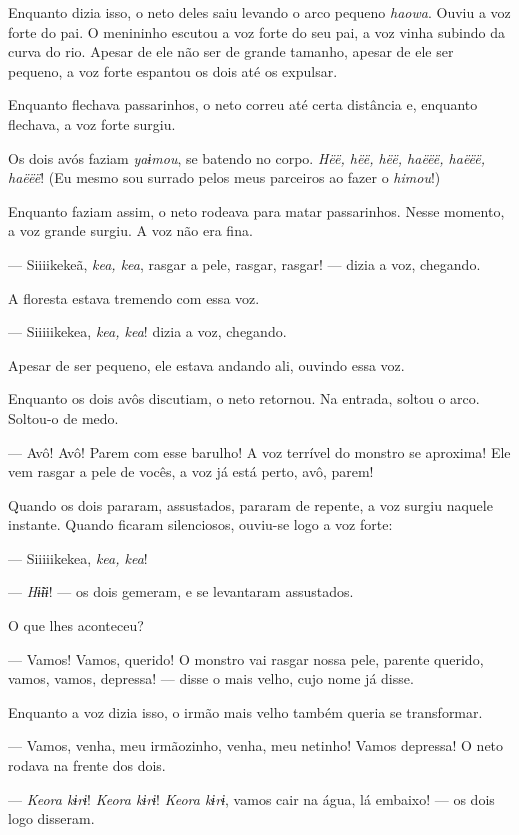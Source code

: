 Enquanto dizia isso, o neto deles saiu levando o arco pequeno \textit{haowa}.
Ouviu a voz forte do pai. O menininho escutou a voz forte do seu pai, a
voz vinha subindo da curva do rio. Apesar de ele não ser de grande
tamanho, apesar de ele ser pequeno, a voz forte espantou os dois até os
expulsar. 

Enquanto flechava passarinhos, o neto correu até certa distância e,
enquanto flechava, a voz forte surgiu. 

Os dois avós faziam \textit{yaɨmou}, se batendo no
corpo. \textit{Hëë, hëë, hëë, haëëë, haëëë, haëëë}! (Eu mesmo sou surrado
pelos meus parceiros ao fazer o \textit{himou}!) 

Enquanto faziam assim, o neto rodeava para matar passarinhos. Nesse
momento, a voz grande surgiu. A voz não era fina. 

--- Siiiikekeã, \textit{kea, kea}, rasgar a pele, rasgar, rasgar! --- dizia
a voz, chegando. 

A floresta estava tremendo com essa voz. 

--- Siiiiikekea, \textit{kea, kea}! dizia a voz, chegando. 

Apesar de ser pequeno, ele estava andando ali, ouvindo essa voz. 

Enquanto os dois avôs discutiam, o neto retornou. Na entrada, soltou o
arco. Soltou-o de medo. 

--- Avô! Avô! Parem com esse barulho! A voz terrível do monstro se
aproxima! Ele vem rasgar a pele de vocês, a voz já está perto, avô,
parem! 

Quando os dois pararam, assustados, pararam de repente, a voz surgiu
naquele instante. Quando ficaram silenciosos, ouviu-se logo a voz
forte: 

--- Siiiiikekea, \textit{kea, kea}! 

--- \textit{Hɨ̃ɨɨ}! --- os dois gemeram, e se levantaram assustados. 

O que lhes aconteceu?

--- Vamos! Vamos, querido! O monstro vai rasgar nossa pele, parente
querido, vamos, vamos, depressa! --- disse o mais velho, cujo nome já
disse. 

Enquanto a voz dizia isso, o irmão mais velho também queria se
transformar. 

--- Vamos, venha, meu irmãozinho, venha, meu netinho! Vamos depressa! O
neto rodava na frente dos dois. 

--- \textit{Keora kɨrɨ}! \textit{Keora kɨrɨ}! \textit{Keora kɨrɨ}, vamos cair na água, lá
embaixo! --- os dois logo disseram. 

